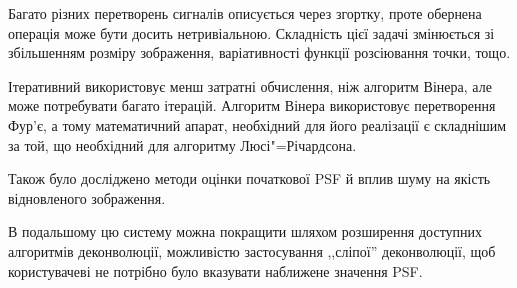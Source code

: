 \documentclass{diploma}
\begin{document}
  Багато різних перетворень сигналів описується через згортку, проте
  обернена операція може бути досить нетривіальною.
  Складність цієї задачі змінюється зі збільшенням розміру зображення,
  варіативності функції розсіювання точки, тощо.

  Ітеративний використовує менш затратні обчислення, ніж алгоритм Вінера,
  але може потребувати багато ітерацій.
  Алгоритм Вінера використовує перетворення Фур’є, а тому математичний
  апарат, необхідний для його реалізації є складнішим за той, що необхідний
  для алгоритму Люсі"=Річардсона.

  Також було досліджено методи оцінки початкової PSF й вплив шуму на якість
  відновленого зображення.

  В подальшому цю систему можна покращити шляхом розширення доступних
  алгоритмів деконволюції, можливістю застосування ,,сліпої'' деконволюції,
  щоб користувачеві не потрібно було вказувати наближене значення PSF.
\newpage
{}
      
      \clearpage
      
      \clearpage
      
      \clearpage
{}
\lstset{language=C++,basicstyle=\small}
  
      \clearpage
  
      \clearpage
  
      \clearpage
  
% 
% 
\end{document}
